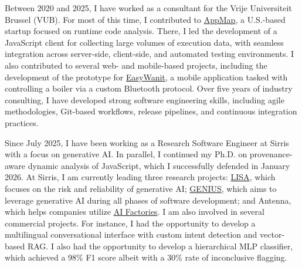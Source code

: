 \documentclass[a4paper,11pt,english]{article}
\newcommand{\ImplicitLink}[2]{\href{#1}{\textcolor{MarkerColour!80!black}{#2}}}
\begin{document}
\vspace{12pt}
Between 2020 and 2025, I have worked as a consultant for the Vrije Universiteit Brussel (VUB). For most of this time, I contributed to \ImplicitLink{https://appmap.io}{AppMap}, a U.S.-based startup focused on runtime code analysis. There, I led the development of a JavaScript client for collecting large volumes of execution data, with seamless integration across server-side, client-side, and automated testing environments. I also contributed to several web- and mobile-based projects, including the development of the prototype for \ImplicitLink{https://www.wanit.com/easywanit}{EasyWanit}, a mobile application tasked with controlling a boiler via a custom Bluetooth protocol. Over five years of industry consulting, I have developed strong software engineering skills, including agile methodologies, Git-based workflows, release pipelines, and continuous integration practices.

\vspace{12pt}
Since July 2025, I have been working as a Research Software Engineer at Sirris with a focus on generative AI. In parallel, I continued my Ph.D. on provenance-aware dynamic analysis of JavaScript, which I successfully defended in January 2026. At Sirris, I am currently leading three research projects: \ImplicitLink{https://lisa-ai.be}{LISA}, which focuses on the risk and reliability of generative AI; \ImplicitLink{https://genius-itea.github.io}{GENIUS}, which aims to leverage generative AI during all phases of software development; and Antenna, which helps companies utilize \ImplicitLink{https://digital-strategy.ec.europa.eu/en/policies/ai-factories}{AI Factories}. I am also involved in several commercial projects. For instance, I had the opportunity to develop a multilingual conversational interface with custom intent detection and vector-based RAG. I also had the opportunity to develop a hierarchical MLP classifier, which achieved a 98\% F1 score albeit with a 30\% rate of inconclusive flagging.
\end{document}
